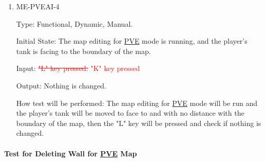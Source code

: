 \documentclass[12pt, titlepage]{article}
\begin{document}
\begin{enumerate}
\item{ME-PVEAI-4\\}

Type: Functional, Dynamic, Manual.
					
Initial State: The map editing for \underline{PVE} mode is running, and the player's tank is facing to the boundary of the map.
					
Input: \textcolor{red}{\sout{"L" key pressed.}} \textcolor{red}{"K" key pressed}
					
Output: Nothing is changed.
					
How test will be performed: The map editing for \underline{PVE} mode will be run and the player's tank will be moved to face to and with no distance with the boundary of the map, then the "L" key will be pressed and check if nothing is changed.

\end{enumerate}

\paragraph{Test for Deleting Wall for \underline{PVE} Map}
\end{document}
